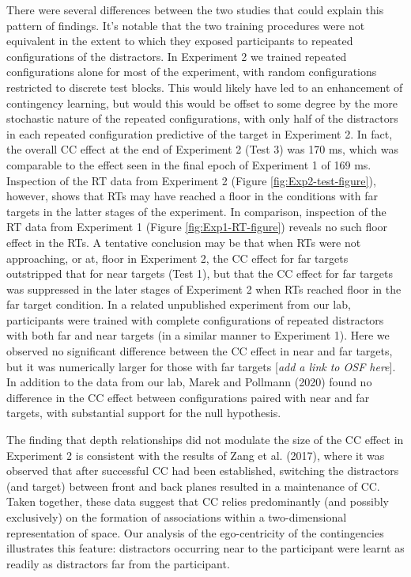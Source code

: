 \documentclass[
  english,
  man,floatsintext]{apa7}
\begin{document}
There were several differences between the two studies that could explain this pattern of findings. It's notable that the two training procedures were not equivalent in the extent to which they exposed participants to repeated configurations of the distractors. In Experiment 2 we trained repeated configurations alone for most of the experiment, with random configurations restricted to discrete test blocks. This would likely have led to an enhancement of contingency learning, but would this would be offset to some degree by the more stochastic nature of the repeated configurations, with only half of the distractors in each repeated configuration predictive of the target in Experiment 2. In fact, the overall CC effect at the end of Experiment 2 (Test 3) was 170 ms, which was comparable to the effect seen in the final epoch of Experiment 1 of 169 ms. Inspection of the RT data from Experiment 2 (Figure \ref{fig:Exp2-test-figure}), however, shows that RTs may have reached a floor in the conditions with far targets in the latter stages of the experiment. In comparison, inspection of the RT data from Experiment 1 (Figure \ref{fig:Exp1-RT-figure}) reveals no such floor effect in the RTs. A tentative conclusion may be that when RTs were not approaching, or at, floor in Experiment 2, the CC effect for far targets outstripped that for near targets (Test 1), but that the CC effect for far targets was suppressed in the later stages of Experiment 2 when RTs reached floor in the far target condition. In a related unpublished experiment from our lab, participants were trained with complete configurations of repeated distractors with both far and near targets (in a similar manner to Experiment 1). Here we observed no significant difference between the CC effect in near and far targets, but it was numerically larger for those with far targets {[}\emph{add a link to OSF here}{]}. In addition to the data from our lab, Marek and Pollmann (2020) found no difference in the CC effect between configurations paired with near and far targets, with substantial support for the null hypothesis.

The finding that depth relationships did not modulate the size of the CC effect in Experiment 2 is consistent with the results of Zang et al. (2017), where it was observed that after successful CC had been established, switching the distractors (and target) between front and back planes resulted in a maintenance of CC. Taken together, these data suggest that CC relies predominantly (and possibly exclusively) on the formation of associations within a two-dimensional representation of space. Our analysis of the ego-centricity of the contingencies illustrates this feature: distractors occurring near to the participant were learnt as readily as distractors far from the participant.
\end{document}
